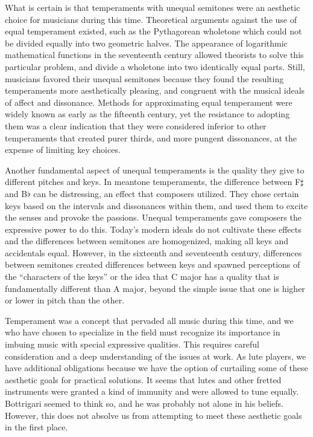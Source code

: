 What is certain is that temperaments with unequal semitones were an aesthetic choice for musicians during this time.
Theoretical arguments against the use of equal temperament existed, such as the Pythagorean wholetone which could not be
divided equally into two geometric halves. The appearance of logarithmic mathematical functions in the seventeenth
century allowed theorists to solve this particular problem, and divide a wholetone into two identically equal parts.
Still, musicians favored their unequal semitones because they found the resulting temperaments more aesthetically
pleasing, and congruent with the musical ideals of affect and dissonance. Methods for approximating equal temperament
were widely known as early as the fifteenth century, yet the resistance to adopting them was a clear indication that
they were considered inferior to other temperaments that created purer thirds, and more pungent dissonances, at the
expense of limiting key choices.

Another fundamental aspect of unequal temperaments is the quality they give to different pitches and keys. In meantone
temperaments, the difference between F$\sharp$ and B$\flat$ can be distressing, an effect that composers utilized. They
chose certain keys based on the intervals and dissonances within them, and used them to excite the senses and provoke
the passions. Unequal temperaments gave composers the expressive power to do this. Today's modern ideals do not
cultivate these effects and the differences between semitones are homogenized, making all keys and accidentals equal.
However, in the sixteenth and seventeenth century, differences between semitones created differences between keys and
spawned perceptions of the ``characters of the keys'' or the idea that C major has a quality that is fundamentally
different than A major, beyond the simple issue that one is higher or lower in pitch than the other.

Temperament was a concept that pervaded all music during this time, and we who have chosen to specialize in the field
must recognize its importance in imbuing music with special expressive qualities. This requires careful consideration
and a deep understanding of the issues at work. As lute players, we have additional obligations because we have the
option of curtailing some of these aesthetic goals for practical solutions. It seems that lutes and other fretted
instruments were granted a kind of immunity and were allowed to tune equally. Bottrigari seemed to think so, and he was
probably not alone in his beliefs. \autocite[19]{HB:1} However, this does not absolve us from attempting to meet these
aesthetic goals in the first place.

